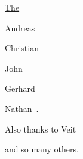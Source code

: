 \medskip

\noindent \uline{The }

\smallskip
Andreas~

Chris\-tian~

John~

Gerhard~

Nathan~.

\medskip

Also thanks to Veit~

and so many others.

\bigskip
\Heart

